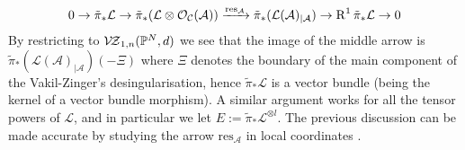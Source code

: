 \[0\rightarrow \tilde\pi_*\mathcal L\rightarrow \tilde\pi_*(\mathcal L\otimes \mathcal{O}_{\mathcal C}(\mathcal A))\xrightarrow{\mathrm{res}_{\mathcal A}} \tilde\pi_*(\mathcal L(\mathcal A)_{|\mathcal A})\rightarrow \operatorname{R}^1\tilde\pi_*\mathcal L\rightarrow 0\]
By restricting to $\mathcal{V\!Z}_{1,n}(\mathbb P^N,d)$ we see that the image of the middle arrow is $\tilde\pi_*(\mathcal L(\mathcal A)_{|\mathcal A})(-\Xi)$ where $\Xi$ denotes the boundary of the main component of the Vakil-Zinger's desingularisation, hence $\tilde\pi_*\mathcal L$ is a vector bundle (being the kernel of a vector bundle morphism). A similar argument works for all the tensor powers of $\mathcal L$, and in particular we let $E:=\tilde\pi_*\mathcal L^{\otimes l}$. The previous discussion can be made accurate by studying the arrow $\mathrm{res}_{\mathcal A}$ in local coordinates \cite[Proposition 4.13]{HL}.

